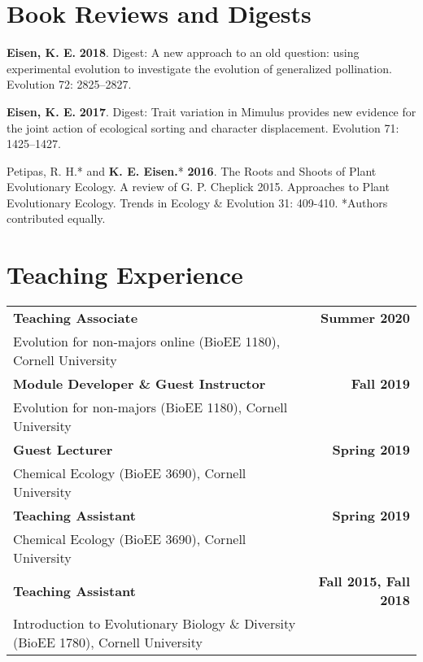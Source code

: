 \documentclass[letterpaper,11pt]{article}
\begin{document}
\section{Book Reviews and Digests}
\begin{etaremune}
\item \textbf{Eisen, K. E.} \textbf{2018}. Digest: A new approach to an old question: using experimental evolution to investigate the evolution of generalized pollination. Evolution 72: 2825–2827.\\
\item \textbf{Eisen, K. E.} \textbf{2017}. Digest: Trait variation in Mimulus provides new evidence for the joint action of ecological sorting and character displacement. Evolution 71: 1425–1427.\\
\item Petipas, R. H.* and \textbf{K. E. Eisen.}* \textbf{2016}. The Roots and Shoots of Plant Evolutionary Ecology. A review of G. P. Cheplick 2015. Approaches to Plant Evolutionary Ecology. Trends in Ecology \& Evolution 31: 409-410. *Authors contributed equally.\\
\end{etaremune}


\section{Teaching Experience}
\begin{tabular*}{1.0\textwidth}[t]{l@{\extracolsep{\fill}}r}
\textbf{Teaching Associate} & {\textbf{Summer 2020}}\\
Evolution for non-majors online (BioEE 1180), Cornell University \vspace{7pt}\\

\textbf{Module Developer \& Guest Instructor} & {\textbf{Fall 2019}}\\
Evolution for non-majors (BioEE 1180), Cornell University \vspace{7pt}\\  

\textbf{Guest Lecturer} & {\textbf{Spring 2019}}\\
Chemical Ecology (BioEE 3690), Cornell University\vspace{7pt}\\

\textbf{Teaching Assistant} & {\textbf{Spring 2019}}\\
Chemical Ecology (BioEE 3690), Cornell University\vspace{7pt}\\

\textbf{Teaching Assistant} & {\textbf{Fall 2015, Fall 2018}}\\
Introduction to Evolutionary Biology \& Diversity (BioEE 1780), Cornell University\\

\end{tabular*}
\end{document}
